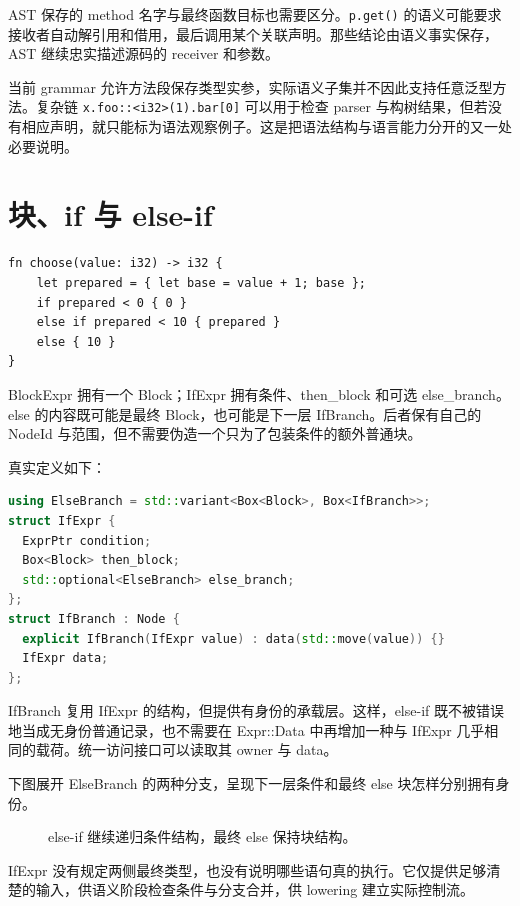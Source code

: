 AST 保存的 method 名字与最终函数目标也需要区分。\texttt{p.get()} 的语义可能要求接收者自动解引用和借用，最后调用某个关联声明。那些结论由语义事实保存，AST 继续忠实描述源码的 receiver 和参数。

当前 grammar 允许方法段保存类型实参，实际语义子集并不因此支持任意泛型方法。复杂链 \texttt{x.foo::<i32>(1).bar[0]} 可以用于检查 parser 与构树结果，但若没有相应声明，就只能标为语法观察例子。这是把语法结构与语言能力分开的又一处必要说明。

\section{块、if 与 else-if}
\begin{lstlisting}[language=Rustless]
fn choose(value: i32) -> i32 {
    let prepared = { let base = value + 1; base };
    if prepared < 0 { 0 }
    else if prepared < 10 { prepared }
    else { 10 }
}
\end{lstlisting}
BlockExpr 拥有一个 Block；IfExpr 拥有条件、then\_block 和可选 else\_branch。else 的内容既可能是最终 Block，也可能是下一层 IfBranch。后者保有自己的 NodeId 与范围，但不需要伪造一个只为了包装条件的额外普通块。

真实定义如下：
\begin{lstlisting}[language=C++]
using ElseBranch = std::variant<Box<Block>, Box<IfBranch>>;
struct IfExpr {
  ExprPtr condition;
  Box<Block> then_block;
  std::optional<ElseBranch> else_branch;
};
struct IfBranch : Node {
  explicit IfBranch(IfExpr value) : data(std::move(value)) {}
  IfExpr data;
};
\end{lstlisting}
IfBranch 复用 IfExpr 的结构，但提供有身份的承载层。这样，else-if 既不被错误地当成无身份普通记录，也不需要在 Expr::Data 中再增加一种与 IfExpr 几乎相同的载荷。统一访问接口可以读取其 owner 与 data。

下图展开 ElseBranch 的两种分支，呈现下一层条件和最终 else 块怎样分别拥有身份。
\begin{figure}[htbp]
\centering
{}
\caption{else-if 继续递归条件结构，最终 else 保持块结构。}
\end{figure}
IfExpr 没有规定两侧最终类型，也没有说明哪些语句真的执行。它仅提供足够清楚的输入，供语义阶段检查条件与分支合并，供 lowering 建立实际控制流。

